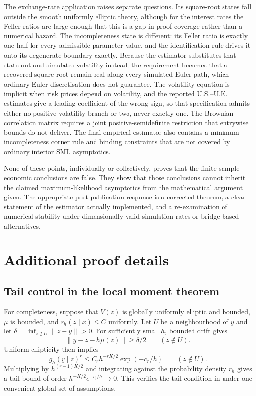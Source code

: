 \documentclass[11pt]{article}
\theoremstyle{definition}
\begin{document}
The exchange-rate application raises separate questions. Its square-root states fall outside the smooth uniformly elliptic theory, although for the interest rates the Feller ratios are large enough that this is a gap in proof coverage rather than a numerical hazard. The incompleteness state is different: its Feller ratio is exactly one half for every admissible parameter value, and the identification rule drives it onto its degenerate boundary exactly. Because the estimator substitutes that state out and simulates volatility instead, the requirement becomes that a recovered square root remain real along every simulated Euler path, which ordinary Euler discretisation does not guarantee. The volatility equation is implicit when risk prices depend on volatility, and the reported U.S.--U.K. estimates give a leading coefficient of the wrong sign, so that specification admits either no positive volatility branch or two, never exactly one. The Brownian correlation matrix requires a joint positive-semidefinite restriction that entrywise bounds do not deliver. The final empirical estimator also contains a minimum-incompleteness corner rule and binding constraints that are not covered by ordinary interior SML asymptotics.

None of these points, individually or collectively, proves that the finite-sample economic conclusions are false. They show that those conclusions cannot inherit the claimed maximum-likelihood asymptotics from the mathematical argument given. The appropriate post-publication response is a corrected theorem, a clear statement of the estimator actually implemented, and a re-examination of numerical stability under dimensionally valid simulation rates or bridge-based alternatives.

\appendix

\section{Additional proof details}\label{app:proofs}

\subsection{Tail control in the local moment theorem}

For completeness, suppose that $V(z)$ is globally uniformly elliptic and bounded, $\mu$ is bounded, and $r_h(z\mid x)\le C$ uniformly. Let $U$ be a neighbourhood of $y$ and let $\delta=\inf_{z\notin U}\|z-y\|>0$. For sufficiently small $h$, bounded drift gives
\[
\|y-z-h\mu(z)\|\ge\delta/2
\qquad(z\notin U).
\]
Uniform ellipticity then implies
\[
g_h(y\mid z)^r
\le C_r h^{-rK/2}\exp(-c_r/h)
\qquad(z\notin U).
\]
Multiplying by $h^{(r-1)K/2}$ and integrating against the probability density $r_h$ gives a tail bound of order $h^{-K/2}e^{-c_r/h}\to0$. This verifies the tail condition in  under one convenient global set of assumptions.
\end{document}
